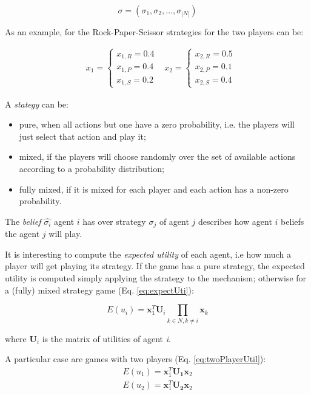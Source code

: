\begin{Topic}[Introduction]
\begin{equation}
\sigma = (\sigma_1, \sigma_2, \dots, \sigma_{|N|})
\label{eq:strategyProfile}
\end{equation}

As an example, for the Rock-Paper-Scissor strategies for the two players can be:

\begin{align*} 
& x_1 =  \begin{cases} x_{1,R} = 0.4 \\ x_{1,P} = 0.4 \\ x_{1,S} = 0.2 \end{cases}
& x_2 =  \begin{cases} x_{2,R} = 0.5 \\ x_{2,P} = 0.1 \\ x_{2,S} = 0.4 \end{cases}
\end{align*} 

A \emph{stategy} can be:

\begin{itemize}
\item pure, when all actions but one have a zero probability, i.e. the players will just select that action and play it; 
\item mixed, if the players will choose randomly over the set of available actions according to a probability distribution;
\item fully mixed, if it is mixed for each player and each action has a non-zero probability.
\end{itemize}

The \emph{belief} $\hat{\sigma_i}$ agent $i$ has over strategy $\sigma_j$ of agent $j$ describes how agent $i$ beliefs the agent $j$ will play.

It is interesting to compute the \emph{expected utility} of each agent, i.e how much a player will get playing its strategy. If the game has a pure strategy, the expected utility is computed simply applying the strategy to the mechanism; otherwise for a (fully) mixed strategy game (Eq. \ref{eq:expectUti}):

\begin{equation}
E(u_i) = \mathbf{x}_1^T \mathbf{U}_i \prod_{k \in N, k \ne i}\mathbf{x}_k
\label{eq:expectUti}
\end{equation}

where $\mathbf{U}_i$ is the matrix of utilities of agent \emph{i}.

A particular case are games with two players (Eq. \ref{eq:twoPlayerUtil}):
\begin{equation}
\begin{array}{r}
E(u_1) = \mathbf{x}_1^T \mathbf{U_1} \mathbf{x}_2\\
E(u_2) = \mathbf{x}_1^T \mathbf{U_2} \mathbf{x}_2
\end{array}
\label{eq:twoPlayerUtil}
\end{equation}


\end{Topic}
